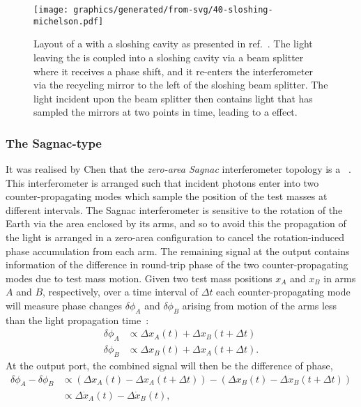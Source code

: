 \begin{figure}
  \centering
  \texttt{[image: graphics/generated/from-svg/40-sloshing-michelson.pdf]}
  \caption[Layout of a \FPMI{} with a sloshing cavity]{\label{fig:sloshing-michelson}Layout of a \FPMI{} with a sloshing cavity as presented in ref.~\cite{Purdue2002}. The light leaving the \FPMI{} is coupled into a sloshing cavity via a beam splitter where it receives a phase shift, and it re-enters the interferometer via the recycling mirror to the left of the sloshing beam splitter. The light incident upon the beam splitter then contains light that has sampled the mirrors at two points in time, leading to a \SM{} effect.}
\end{figure}

\subsubsection{The Sagnac-type \SM{}}
It was realised by Chen that the \emph{zero-area Sagnac} interferometer topology is a \SM{}~\cite{Chen2003}. This interferometer is arranged such that incident photons enter into two counter-propagating modes which sample the position of the test masses at different intervals. The Sagnac interferometer is sensitive to the rotation of the Earth via the area enclosed by its arms, and so to avoid this the propagation of the light is arranged in a zero-area configuration to cancel the rotation-induced phase accumulation from each arm. The remaining signal at the output contains information of the difference in round-trip phase of the two counter-propagating modes due to test mass motion. Given two test mass positions $x_{A}$ and $x_{B}$ in arms $A$ and $B$, respectively, over a time interval of $\Delta t$ each counter-propagating mode will measure phase changes $\delta \phi_{A}$ and $\delta \phi_{B}$ arising from motion of the arms less than the light propagation time~\cite{Chen2003}:
\begin{align}
  \delta \phi_{A} &\propto \Delta x_{A} \left( t \right) + \Delta x_{B} \left( t + \Delta t \right) \\
  \delta \phi_{B} &\propto \Delta x_{B} \left( t \right) + \Delta x_{A} \left( t + \Delta t \right).
\end{align}
At the output port, the combined signal will then be the difference of phase,
\begin{equation}
  \begin{split}
    \delta \phi_{A} - \delta \phi_{B} &\propto \left( \Delta x_{A} \left( t \right) - \Delta x_{A} \left( t + \Delta t \right) \right) - \left( \Delta x_{B} \left( t \right) - \Delta x_{B} \left( t + \Delta t \right) \right) \\
                                      &\propto \Delta \dot{x}_{A} \left( t \right) - \Delta \dot{x}_{B} \left( t \right),
  \end{split}
\end{equation}
